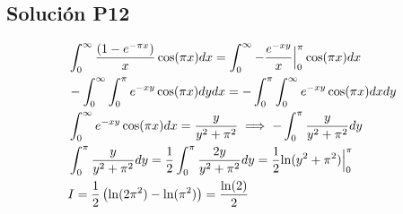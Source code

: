 \begin{CajaTitulo}{\begin{center}\subsection{Solución P12}\end{center}}
    \vspace{0.3cm}
    \begin{align*}
        &\int_{0}^{\infty}\frac{(1-e^{-\pi x})}{x}\cos(\pi x ) dx = \int_{0}^{\infty}-\frac{e^{-xy}}{x}\Big|_{0}^{\pi}\cos(\pi x )dx \\
        &-\int_{0}^{\infty}\int_{0}^{\pi}e^{-xy}\cos(\pi x )dy dx = - \int_{0}^{\pi}\int_{0}^{\infty}e^{-xy}\cos(\pi x )dx dy \\
        &\int_{0}^{\infty}e^{-xy}\cos(\pi x )dx = \frac{y}{y^2 + \pi^2} \implies -\int_{0}^{\pi}\frac{y}{y^2 + \pi^2}dy  \\
        &\int_{0}^{\pi}\frac{y}{y^2 + \pi^2}dy = \frac{1}{2}\int_{0}^{\pi}\frac{2y}{y^2 + \pi^2}dy =  \frac{1}{2}{\ln(y^2 + \pi^2)}\Big|_{0}^{\pi} \\
        &I = \frac{1}{2}\left(\ln(2\pi^2) - \ln(\pi^2)\right) = \frac{\ln(2)}{2}
\end{align*}
\end{CajaTitulo}